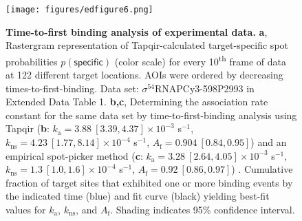 \begin{figure}[t]
\centering
\texttt{[image: figures/edfigure6.png]}
\caption{\textbf{Time-to-first binding analysis of experimental data.}  \textbf{a}, Rastergram representation of Tapqir-calculated target-specific spot  probabilities $p(\mathsf{specific})$ (color scale) for every 10\textsuperscript{th} frame of data at 122 different target locations.  AOIs were ordered by decreasing times-to-first-binding. Data set: $\sigma^{54}$RNAPCy3-598P2993 in Extended Data Table 1. \textbf{b,c}, Determining the association rate constant for the same data set by  time-to-first-binding analysis using Tapqir (\textbf{b}: $k_\mathrm{a} = 3.88 \: [3.39, 4.37] \times 10^{-3}$ s$^{-1}$, $k_\mathrm{ns} = 4.23 \: [1.77, 8.14] \times 10^{-4}$ s$^{-1}$, $A_\mathrm{f} = 0.904 \: [0.84, 0.95]$) and an empirical spot-picker method (\textbf{c}: $k_\mathrm{a} = 3.28 \: [2.64, 4.05] \times 10^{-3}$ s$^{-1}$, $k_\mathrm{ns} = 1.3 \: [1.0, 1.6] \times 10^{-4}$ s$^{-1}$, $A_\mathrm{f} = 0.92 \: [0.86, 0.97]$) \cite{Friedman2013-sf}. Cumulative fraction of target sites that exhibited one or more binding events by the indicated time (blue) and fit curve (black) yielding best-fit values for $k_\mathrm{a}$, $k_\mathrm{ns}$, and $A_\mathrm{f}$. Shading indicates 95\% confidence interval.
}
\label{fig:sigma54_298P2993}
\end{figure}
\clearpage
\pagebreak


